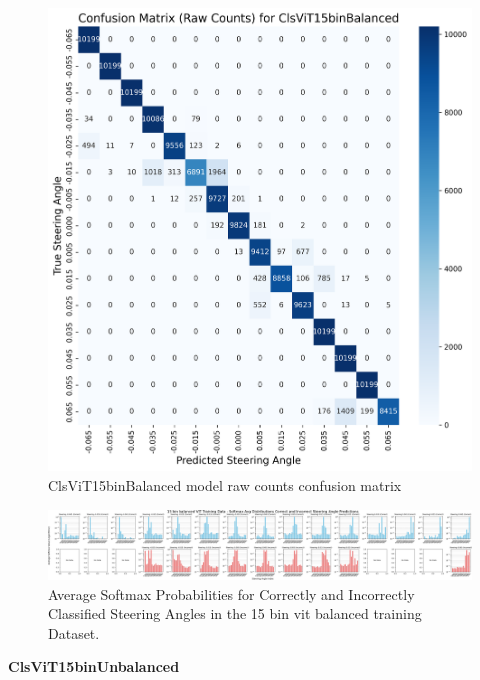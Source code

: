 \begin{figure}[H]
\centering
\includegraphics[width=1\linewidth]{Figures/Results/cm_raw_ClsViT15binBalanced.png}
\caption{ClsViT15binBalanced model raw counts confusion matrix}
\label{fig:cm_raw_ClsViT15binBalanced}
\end{figure}

\begin{figure}[H]
    \centering
    \includegraphics[width=1\linewidth]{Figures/Results/15_bins_vit_softmax_dist_plot_balanced.png}
    \caption{Average Softmax Probabilities for Correctly and Incorrectly Classified Steering Angles in the 15 bin vit balanced training Dataset.}
    \label{fig:15_bins_vit_softmax_dist_balanced}
\end{figure}


\textbf{ClsViT15binUnbalanced}

